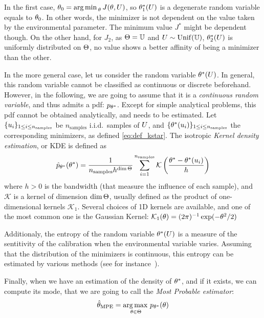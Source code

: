 \documentclass[../../Main_ManuscritThese.tex]{subfiles}
\begin{document}
In the first case, $\theta_0 = \operatorname*{arg\,min \,}_{\theta} J(\theta, U)$, so $\theta_1^*(U)$ is a degenerate random variable equals to  $\theta_0$. In other words, the minimizer is not dependent on the value taken by the environmental parameter. The minimum value $J^*$ might be dependent though. On the other hand, for $J_2$, as $\Theta=\mathbb{U}$ and $U \sim \mathrm{Unif}(\mathbb{U})$, $\theta_2^*(U)$ is uniformly distributed on $\Theta$, no value shows a better affinity of being a minimizer than the other.

In the more general case, let us consider the random variable $\theta^*(U)$. In general, this random variable cannot be classified as continuous or discrete beforehand. However, in the following, we are going to assume that it is a \emph{continuous random variable}, and thus admits a pdf: $p_{\theta^*}$.
Except for simple analytical problems, this pdf cannot be obtained analytically, and needs to be estimated.
Let $\{u_i\}_{1\leq i \leq n_{\mathrm{samples}}}$ be $n_{\mathrm{samples}}$ i.i.d.\ samples of $U$, and
$\{\theta^*(u_i)\}_{1\leq i \leq n_{\mathrm{samples}}}$ the corresponding minimizers, as defined \cref{eq:def_kstar}.
The isotropic \emph{Kernel density estimation}, or KDE is defined as
\begin{equation}
  \hat{p}_{\theta^*}(\theta^*) = \frac{1}{n_{\mathrm{samples}} h^{\dim \Theta}} \sum_{i=1}^{n_{\mathrm{samples}}} \mathcal{K}\left(\frac{\theta^* - \theta^*(u_i)}{h}\right)
\end{equation}
where $h>0$ is the bandwidth (that measure the influence of each sample), and $\mathcal{K}$ is a kernel of dimension $\dim \Theta$, usually defined as the product of one-dimensional kernels $\mathcal{K}_1$. Several choices of 1D kernels are available, and one of the most common one is the Gaussian Kernel: $\mathcal{K}_1(\theta) = (2\pi)^{-1}\exp(-\theta^2 /2)$


Additionaly, the entropy of the random variable $\theta^*(U)$ is a measure of the sentitivity of the calibration when the environmental variable varies.
Assuming that the distribution of the minimizers is continuous, this entropy can be estimated by various methods (see for instance~\cite{beirlant_nonparametric_1997}).

Finally, when we have an estimation of the density of $\theta^*$, and if it exists, we can compute its mode, that we are going to call the \emph{Most Probable estimator}:
\begin{equation}
  \hat{\theta}_{\mathrm{MPE}} = \operatorname*{arg\,max \,}_{\theta \in \Theta} p_{\theta^*}(\theta)
\end{equation}
\end{document}
